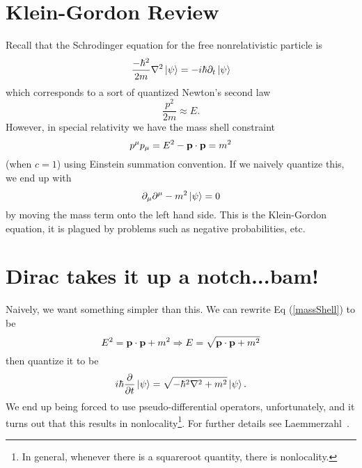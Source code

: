 \section{Klein-Gordon Review}

Recall that the Schrodinger equation for the free nonrelativistic particle is
\begin{equation}
\frac{-\hbar^2}{2m}\nabla^2 \left|{\psi}\right\rangle = -i\hbar\partial_{t}\left|{\psi}\right\rangle
\end{equation}
which corresponds to a sort of quantized Newton's second law
\begin{equation}
\frac{p^2}{2m} \approx E.
\end{equation}
However, in special relativity we have the mass shell constraint
\begin{equation}\label{massShell}
p^\mu p_\mu = E^2 - \bold{p}\cdot\bold{p} = m^2
\end{equation}
(when $c=1$) using Einstein summation convention. If we naively quantize this, we end up with
\begin{equation}\label{KGeqn}
\partial_{\mu}\partial^{\mu} - m^2 \left|{\psi}\right\rangle = 0
\end{equation}
by moving the mass term onto the left hand side. This is the Klein-Gordon equation, it is plagued by problems such as negative probabilities, etc.



\section{Dirac takes it up a notch...bam!}

Naively, we want something simpler than this. We can rewrite Eq (\ref{massShell}) to be
\begin{equation}
E^2 = \bold{p}\cdot\bold{p} + m^2\Rightarrow E = \sqrt{\bold{p}\cdot\bold{p} + m^2}
\end{equation}
then quantize it to be
\begin{equation}
i\hbar\frac{\partial}{\partial t}\left|{\psi}\right\rangle = \sqrt{-\hbar^2\nabla^2 + m^2}\left|{\psi}\right\rangle.
\end{equation}
We end up being forced to use pseudo-differential operators, unfortunately, and it turns out that this results in nonlocality\footnote{In general, whenever there is a squareroot quantity, there is nonlocality.}. For further details see Laemmerzahl~\cite{pseudodifferentialKG}.

